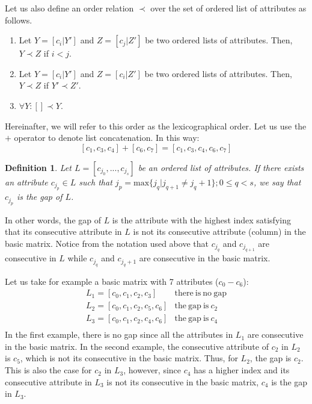 \documentclass[authoryear,preprint,review,12pt]{elsarticle}
\newtheorem{definition}{Definition}
\begin{document}
	Let us also define an order relation $\prec$ over the set of ordered list of attributes as follows.
	\begin{enumerate}
		\item Let $Y=[c_i|Y']$ and $Z=[c_j|Z']$ be two ordered lists of attributes. Then, $Y \prec Z$ if $i<j$.
		\item Let $Y=[c_i|Y']$ and $Z=[c_i|Z']$ be two ordered lists of attributes. Then, $Y \prec Z$ if $Y' \prec Z'$.
		\item $\forall Y:  [] \prec Y$.
	\end{enumerate}
	Hereinafter, we will refer to this order as the lexicographical order. Let us use the $+$ operator to denote list concatenation. In this way: $$[c_1,c_3,c_4]+[c_6,c_7]=[c_1,c_3,c_4,c_6,c_7]$$
		
	
	\begin{definition}\label{def:gap}
		Let $L = [c_{j_0},...,c_{j_s}]$ be an ordered list of attributes. If there exists an attribute $c_{j_p} \in L$ such that ${j_p}=\mathrm{max}\{j_q | j_{q+1} \neq j_q+1\}; 0 \leq q < s$, we say that $c_{j_p}$ is the gap of $L$.
	\end{definition}
	
	In other words, the gap of $L$ is the attribute with the highest index satisfying that its consecutive attribute in $L$ is not its consecutive attribute (column) in the basic matrix. Notice from the notation used above that $c_{j_q}$ and $c_{j_{q+1}}$ are consecutive in $L$ while $c_{j_q}$ and $c_{j_q+1}$ are consecutive in the basic matrix.
	
	Let us take for example a basic matrix with 7 attributes ($c_0 - c_6$):
	$$\begin{array}{ll}
	{L_1=[c_0,c_1,c_2,c_3]} 		& \mathrm{there~is~no~gap}\\
	{L_2=[c_0,c_1,c_2,c_5,c_6]} 	& \mathrm{the~gap~is~} c_2\\
	{L_3=[c_0,c_1,c_2,c_4,c_6]} 	& \mathrm{the~gap~is~} c_4\\
	\end{array}$$
	In the first example, there is no gap since all the attributes in $L_1$ are consecutive in the basic matrix. In the second example, the consecutive attribute of $c_2$ in $L_2$ is $c_5$, which is not its consecutive in the basic matrix. Thus, for $L_2$, the gap is $c_2$. This is also the case for $c_2$ in $L_3$, however, since $c_4$ has a higher index and its consecutive attribute in $L_3$ is not its consecutive in the basic matrix, $c_4$ is the gap in $L_3$.
\end{document}

